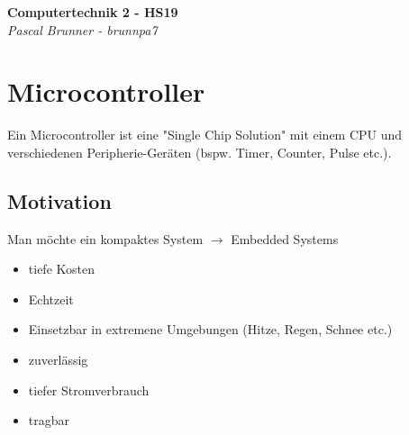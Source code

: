 \documentclass{article}
\begin{document}
\begin{titlepage}
   \begin{center}
      \Large\textbf{Computertechnik 2 - HS19}\\
      \large\textit{Pascal Brunner - brunnpa7}
   \end{center}
\end{titlepage}


\tableofcontents
\newpage



\section{Microcontroller}
Ein Microcontroller ist eine "Single Chip Solution" mit einem CPU und verschiedenen Peripherie-Geräten (bspw. Timer, Counter, Pulse etc.).
\subsection{Motivation}
Man möchte ein kompaktes System $\rightarrow$ Embedded Systems
\begin{itemize}
	\item tiefe Kosten
	\item Echtzeit
	\item Einsetzbar in extremene Umgebungen (Hitze, Regen, Schnee etc.)
	\item zuverlässig
	\item tiefer Stromverbrauch
	\item tragbar
\end{itemize}
\end{document}
